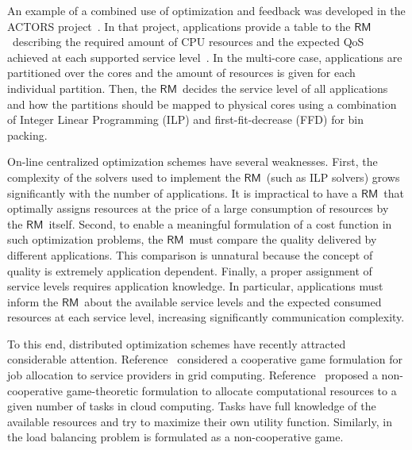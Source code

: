 \documentclass[letter,11pt]{article}
\begin{document}
An example of a combined use of optimization and feedback was developed in the ACTORS project~\cite{Bin11,Arz11}. In that project, applications provide a table to the {$\mathsf{RM}$}\ describing the required amount of CPU resources and the expected QoS achieved at each supported service level~\cite{Bin11,Arz11}.  In the multi-core case, applications are partitioned over the cores and the amount of resources is given for each individual partition. Then, the {$\mathsf{RM}$}\
decides the service level of all applications and how the partitions should be mapped to physical cores using a combination of Integer Linear Programming (ILP) and first-fit-decrease (FFD) for bin packing.

On-line centralized optimization schemes have several weaknesses. First, the complexity of the solvers used to implement the {$\mathsf{RM}$}\ (such as ILP solvers) grows significantly with the number of applications. It is impractical to have a {$\mathsf{RM}$}\ that optimally assigns resources at the price of a large consumption of resources by the {$\mathsf{RM}$}\
itself.  Second, to enable a meaningful formulation of a cost function in such optimization problems, the {$\mathsf{RM}$}\ must compare the quality delivered by different applications.  This comparison is unnatural because the concept of quality is extremely application dependent. Finally, a proper assignment of service levels requires application
knowledge. In particular, applications must inform the {$\mathsf{RM}$}\ about the available service levels and the expected consumed resources at each service level, increasing significantly communication complexity. 

To this end, distributed optimization schemes have recently attracted considerable attention. Reference~\cite{Sub08} considered a cooperative game formulation for job allocation to service providers in grid computing. Reference~\cite{Wei10} proposed a non-cooperative game-theoretic formulation to allocate computational resources to a given number of tasks in cloud computing. Tasks have full knowledge of the available resources and try to maximize their own utility function. Similarly, in \cite{Gro05} the load balancing problem is formulated as a non-cooperative game. 
\end{document}
